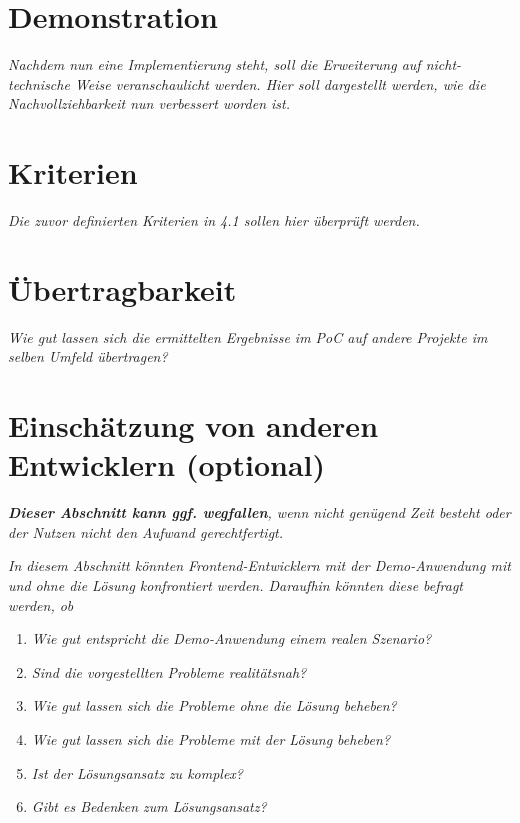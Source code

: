 
\section{Demonstration}

	\textit{Nachdem nun eine Implementierung steht, soll die Erweiterung auf nicht-technische Weise veranschaulicht werden. Hier soll dargestellt werden, wie die Nachvollziehbarkeit nun verbessert worden ist.}
	
\section{Kriterien}

	\textit{Die zuvor definierten Kriterien in 4.1 sollen hier überprüft werden.}
	
\section{Übertragbarkeit}

	\textit{Wie gut lassen sich die ermittelten Ergebnisse im PoC auf andere Projekte im selben Umfeld übertragen?}
	
\section{Einschätzung von anderen Entwicklern (optional)}

	\textit{\textbf{Dieser Abschnitt kann ggf. wegfallen}, wenn nicht genügend Zeit besteht oder der Nutzen nicht den Aufwand gerechtfertigt.}
	
	\textit{In diesem Abschnitt könnten Frontend-Entwicklern mit der Demo-Anwendung mit und ohne die Lösung konfrontiert werden. Daraufhin könnten diese befragt werden, ob}
	
	\begin{enumerate}
		\item \textit{Wie gut entspricht die Demo-Anwendung einem realen Szenario?}
		\item \textit{Sind die vorgestellten Probleme realitätsnah?}
		\item \textit{Wie gut lassen sich die Probleme ohne die Lösung beheben?}
		\item \textit{Wie gut lassen sich die Probleme mit der Lösung beheben?}
		\item \textit{Ist der Lösungsansatz zu komplex?}
		\item \textit{Gibt es Bedenken zum Lösungsansatz?}
	\end{enumerate}